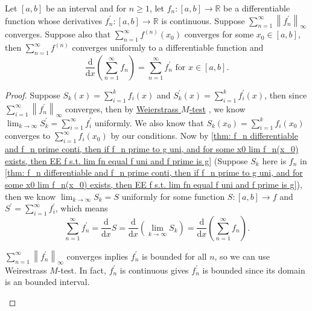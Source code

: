 \begin{corollary}
    Let \([a, b]\) be an interval and for \(n \ge 1\), let \(f_n: [a, b] \to \mathbb{R} \) be a differentiable function whose derivatives \(f_n^{\prime} :[a, b] \to \mathbb{R} \) is continuous. Suppose \(\sum_{n=1}^{\infty} \left\lVert f_n^{\prime}  \right\rVert _\infty \) converges. Suppose also that \(\sum_{n=1}^{\infty} f^{(n)}(x_0) \) converges for some \(x_0 \in [a, b]\), then \(\sum_{n=1}^{\infty} f^{(n)} \) converges uniformly to a differentiable function and 
    \[
        \frac{\mathrm{d}}{\mathrm{d}x} \left( \sum_{n=1}^{\infty} f_n  \right) = \sum_{n=1}^{\infty} f_n^{\prime} \text{ for } x \in [a, b].    
    \]        
\end{corollary}
\begin{proof}
    Suppose \(S_k(x) = \sum_{i=1}^k f_i(x) \) and \(S_k^{\prime} (x) = \sum_{i=1}^k f_i^{\prime} (x) \), then since \(\sum_{i=1}^{\infty} \left\lVert f_n^{\prime}  \right\rVert _{\infty }  \) converges, then by \hyperref[thm: Weierstrass M-test (bounded and conti)]{Weierstrass \(M\)-test} , we know \(\lim_{k \to \infty} S_k^{\prime} = \sum_{i=1}^{\infty} f_i^{\prime}   \) uniformly. We also know that \(S_k(x_0) = \sum_{i=1}^k f_i(x_0) \) converges to \(\sum_{i=1}^{\infty} f_i(x_0) \) by our conditions. Now by \autoref{thm: f_n differentiable and f_n prime conti, then if f_n prime to g uni, and for some x0 lim f_n(x_0) exists, then EE f s.t. lim fn equal f uni and f prime is g} (Suppose \(S_k\) here is \(f_n\) in \autoref{thm: f_n differentiable and f_n prime conti, then if f_n prime to g uni, and for some x0 lim f_n(x_0) exists, then EE f s.t. lim fn equal f uni and f prime is g}), then we know \(\lim_{k \to \infty} S_k = S\) uniformly for some function \(S:[a, b] \to f\) and \(S^{\prime} = \sum_{i=1}^{\infty} f_i^{\prime}  \), which means 
    \[
        \sum_{n=1}^{\infty} f_n^{\prime} = \frac{\mathrm{d}}{\mathrm{d}x} S  = \frac{\mathrm{d}}{\mathrm{d}x} \left( \lim_{k \to \infty} S_k  \right) = \frac{\mathrm{d}}{\mathrm{d}x} \left( \sum_{n=1}^{\infty} f_n  \right).   
    \] 
    \begin{note}
        \(\sum_{n=1}^{\infty} \left\lVert f_n^{\prime}  \right\rVert_\infty   \) converges inplies \(f_n^{\prime} \) is bounded for all \(n\), so we can use Weirestrass \(M\)-test. In fact, \(f_n^{\prime} \) is continuous gives \(f_n^{\prime} \) is bounded since its domain is an bounded interval.  
    \end{note}         
\end{proof}

